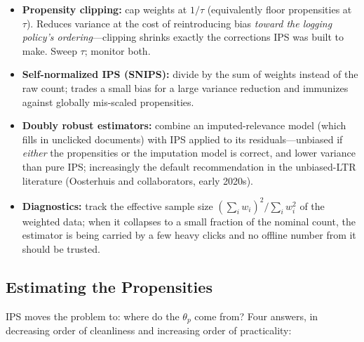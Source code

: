\begin{itemize}
    \item \textbf{Propensity clipping:} cap weights at $1/\tau$ (equivalently floor propensities at $\tau$). Reduces variance at the cost of reintroducing bias \textit{toward the logging policy's ordering}---clipping shrinks exactly the corrections IPS was built to make. Sweep $\tau$; monitor both.
    \item \textbf{Self-normalized IPS (SNIPS):} divide by the sum of weights instead of the raw count; trades a small bias for a large variance reduction and immunizes against globally mis-scaled propensities.
    \item \textbf{Doubly robust estimators:} combine an imputed-relevance model (which fills in unclicked documents) with IPS applied to its residuals---unbiased if \textit{either} the propensities or the imputation model is correct, and lower variance than pure IPS; increasingly the default recommendation in the unbiased-LTR literature (Oosterhuis and collaborators, early 2020s).
    \item \textbf{Diagnostics:} track the effective sample size $(\sum_i w_i)^2 / \sum_i w_i^2$ of the weighted data; when it collapses to a small fraction of the nominal count, the estimator is being carried by a few heavy clicks and no offline number from it should be trusted.
\end{itemize}

\subsection{Estimating the Propensities}

IPS moves the problem to: where do the $\theta_p$ come from? Four answers, in decreasing order of cleanliness and increasing order of practicality:

